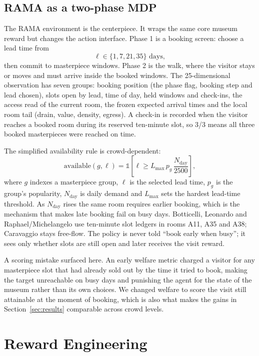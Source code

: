 \documentclass[11pt]{article}
\numberwithin{equation}{section} %
\newcommand{\ind}{\mathbb{1}}
\begin{document}
\subsection{RAMA as a two-phase MDP}

The RAMA environment is the centerpiece. It wraps the same core museum reward but changes the action
interface. Phase 1 is a booking screen: choose a lead time from
\[
\ell\in\{1,7,21,35\}\text{ days},
\]
then commit to masterpiece windows. Phase 2 is the walk, where the visitor stays or moves and must arrive
inside the booked windows. The 25-dimensional observation has seven groups: booking position (the phase flag,
booking step and lead chosen), slots open by lead, time of day, held windows and check-ins, the access read of
the current room, the frozen expected arrival times and the local room tail (drain, value, density, egress). A
check-in is recorded when the visitor reaches a booked room during its reserved ten-minute slot, so 3/3 means
all three booked masterpieces were reached on time.

The simplified availability rule is crowd-dependent:
\begin{equation}
\text{available}(g,\ell)=
\ind\!\left[\ell \ge L_{\max}\,p_g\,\frac{N_{\text{day}}}{2500}\right],
\label{eq:avail}
\end{equation}
where $g$ indexes a masterpiece group, $\ell$ is the selected lead time, $p_g$ is the group's popularity,
$N_{\text{day}}$ is daily demand and $L_{\max}$ sets the hardest lead-time threshold. As $N_{\text{day}}$ rises
the same room requires earlier booking, which is the mechanism that makes late booking fail on busy days.
Botticelli, Leonardo and Raphael/Michelangelo use ten-minute slot ledgers in rooms A11, A35 and A38;
Caravaggio stays free-flow. The policy is never told ``book early when busy''; it sees only whether slots are
still open and later receives the visit reward.

A scoring mistake surfaced here. An early welfare metric charged a visitor for any masterpiece slot that had
already sold out by the time it tried to book, making the target unreachable on busy days and punishing the
agent for the state of the museum rather than its own choices. We changed welfare to score the visit still
attainable at the moment of booking, which is also what makes the gains in Section~\ref{sec:results}
comparable across crowd levels.

\section{Reward Engineering}
\label{sec:reward}
\end{document}
